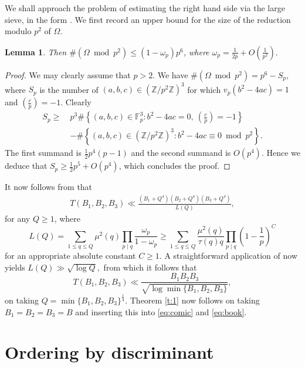 \documentclass[reqno, 12pt, twoside]{amsart}
\numberwithin{equation}{section}
\newcommand{\ZZ}{\mathbb{Z}}
\newcommand{\0}{\mathbf{0}}
\newcommand{\FF}{\mathbb{F}}
\newtheorem{lemma}[theorem]{Lemma}
\theoremstyle{definition}
\renewcommand{\leq}{\leqslant}
\renewcommand{\geq}{\geqslant}
\begin{document}
We shall approach the problem of estimating the right hand side via the
large sieve, 
in the form 
\cite[Lemma~6.3]{large}.  
We first record an upper bound for the size of the reduction modulo $p^2$ of $\Omega$.

\begin{lemma}
Then $\#(\Omega \bmod{p^2})\leq (1-\omega_p)p^6$, where
$\omega_p=\frac{1}{2p}+O(\frac{1}{p^2}).$
\end{lemma}

\begin{proof}
We may clearly assume that $p>2$. We have $\#(\Omega \bmod{p^2})=p^6-S_p$, where
$S_p$ is the number of $(a,b,c)\in (\ZZ/p^2\ZZ)^3$ for which $v_p(b^2-4ac)=1$ and 
$(\frac{c}{p})= -1$.
Clearly
\begin{align*}
S_p\geq~& 
p^3\#\left\{ (a,b,c)\in \FF_p^3: b^2-4ac=0, ~\left(\frac{c}{p}\right)= -1\right\}\\
&-\#\left\{
(a,b,c)\in (\ZZ/p^2\ZZ)^3: b^2-4ac\equiv 0\bmod{p^2}\right\}.
\end{align*}
The  first summand is  $\frac{1}{2}p^4(p-1)$
and the second summand is $O(p^4)$.
Hence we deduce that
$S_p\geq \frac{1}{2}p^5+O(p^4)$, which concludes the proof.
\end{proof}

It now follows from 
\cite[Lemma~6.3]{large} that 
\begin{align*}
T(B_1,B_2,B_3)
\ll \frac{(B_1+Q^4)(B_2+Q^4)(B_3+Q^4)}{L(Q)},
\end{align*}
for any $Q\geq 1$,
where
$$
L(Q)=\sum_{1\leq q\leq Q}\mu^2(q)\prod_{p\mid q} \frac{\omega_p}{1-\omega_p}\geq 
\sum_{1\leq q\leq Q}\frac{\mu^2(q)}{\tau(q)q}\prod_{p\mid q} \left(1-\frac{1}{p}\right)^C
$$
for an appropriate absolute constant $C\geq 1$.
A straightforward application of 
 \cite[Thm.~A.5]{FrIwOdC} now yields 
$
L(Q)\gg \sqrt{\log Q},
$
from which it follows that 
\begin{equation}\label{eq:Tve}
T(B_1,B_2,B_3)\ll \frac{B_1B_2B_3}{\sqrt{\log \min \{B_1,B_2,B_3\}}},
\end{equation}
on taking $Q=\min \{B_1,B_2,B_3\}^{\frac{1}{4}}$.
Theorem \ref{t:1} now follows on 
taking $B_1=B_2=B_3=B$ and 
inserting this into \eqref{eq:comic} and \eqref{eq:book}.




\section{Ordering by discriminant}
\end{document}

